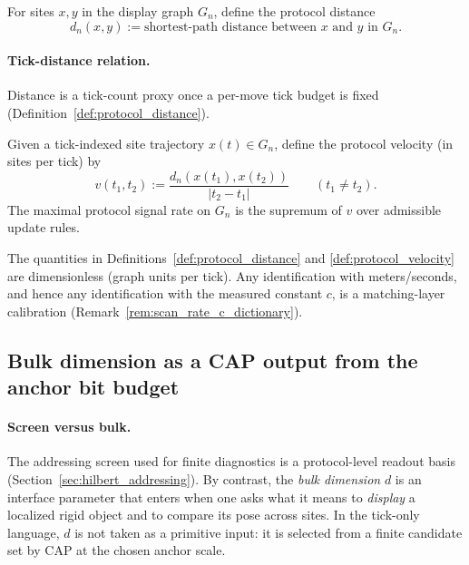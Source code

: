 \begin{definition}
\label{def:protocol_distance}
For sites $x,y$ in the display graph $G_n$, define the protocol distance
\[
d_n(x,y):=\text{shortest-path distance between $x$ and $y$ in $G_n$}.
\]
\end{definition}

\paragraph{Tick-distance relation.}
\InterfaceTag Distance is a tick-count proxy once a per-move tick budget is fixed (Definition~\ref{def:protocol_distance}).

\begin{definition}
\label{def:protocol_velocity}
Given a tick-indexed site trajectory $x(t)\in G_n$, define the protocol velocity (in sites per tick) by
\[
v(t_1,t_2):=\frac{d_n(x(t_1),x(t_2))}{|t_2-t_1|}\qquad (t_1\neq t_2).
\]
The maximal protocol signal rate on $G_n$ is the supremum of $v$ over admissible update rules.
\end{definition}

\begin{remark}
\label{rem:tick_velocity_to_c}
The quantities in Definitions~\ref{def:protocol_distance} and \ref{def:protocol_velocity} are dimensionless (graph units per tick).
Any identification with meters/seconds, and hence any identification with the measured constant $c$, is a matching-layer calibration (Remark~\ref{rem:scan_rate_c_dictionary}).
\end{remark}

\subsection{Bulk dimension as a CAP output from the anchor bit budget}
\label{subsec:tick_to_bulk_dimension}

\paragraph{Screen versus bulk.}
The addressing screen used for finite diagnostics is a protocol-level readout basis (Section~\ref{sec:hilbert_addressing}).
By contrast, the \emph{bulk dimension} $d$ is an interface parameter that enters when one asks what it means to \emph{display} a localized rigid object and to compare its pose across sites.
In the tick-only language, $d$ is not taken as a primitive input: it is selected from a finite candidate set by CAP at the chosen anchor scale.

